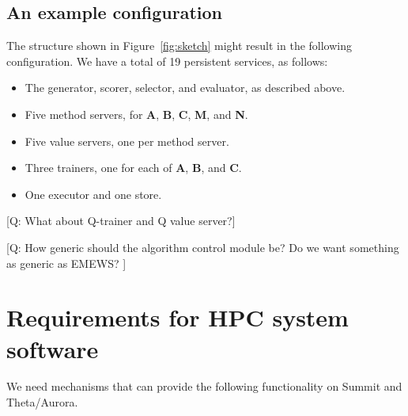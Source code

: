 \documentclass[10pt]{article}
\newcommand\q[1]{{\color{blue}[Q: #1]}}
\begin{document}
\subsection{An example configuration}

The structure shown in Figure~\ref{fig:sketch} might result in the following configuration. 
We have a total of 19 persistent services, as follows:
\begin{itemize}\itemsep-0.2em
\item
The generator, scorer, selector, and evaluator, as described above.
\item
Five method servers, for \textbf{A}, \textbf{B}, \textbf{C}, \textbf{M}, and \textbf{N}.
\item
Five value servers, one per method server.
\item
Three trainers, one for each of \textbf{A}, \textbf{B}, and \textbf{C}.
\item
One executor and one store. 
\end{itemize}

\q{What about Q-trainer and Q value server?}

\q{How generic should the algorithm control module be?  Do we want something as generic as EMEWS?  }









\section{Requirements for HPC system software}

We need mechanisms that can provide the following functionality on Summit and Theta/Aurora.
\end{document}
